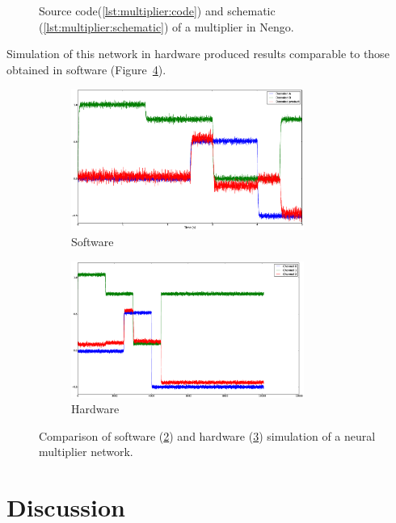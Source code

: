 \documentclass[english]{article}
\begin{document}
\begin{figure}
\caption[A multiplier in Nengo.]
{Source code(\ref{lst:multiplier:code}) and schematic (\ref{lst:multiplier:schematic})
of a multiplier in Nengo.}
\label{lst:multiplier}
\end{figure}

Simulation of this network in hardware produced results comparable to those obtained in software
(Figure~\ref{fig:multiplier}).

\begin{figure}
\centering


\begin{subfigure}[b]{0.5\textwidth}
\centering
\includegraphics[width=3in]{multiplier-sw.eps}
\caption{Software}
\label{fig:multiplier:sw}
\end{subfigure}

\begin{subfigure}[b]{0.5\textwidth}
\centering
\includegraphics[width=3in]{multiplier.eps}
\caption{Hardware}
\label{fig:multiplier:hw}
\end{subfigure}

\caption[Multiplier simulation comparison.]
{Comparison of software (\ref{fig:multiplier:sw}) and hardware (\ref{fig:multiplier:hw})
simulation of a neural multiplier network.}
\label{fig:multiplier}
\end{figure}

\section{Discussion}
\end{document}
